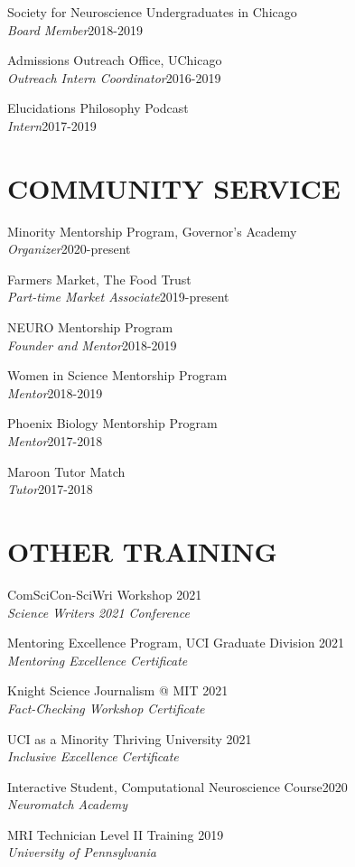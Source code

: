 \documentclass[margin, 10pt]{res} %
\begin{document}
\begin{resume}
{Society for Neuroscience Undergraduates in Chicago} \\
{\sl Board Member}\hfill{2018-2019}

{Admissions Outreach Office, UChicago} \\
{\sl Outreach Intern Coordinator}\hfill{2016-2019}

{Elucidations Philosophy Podcast} \\
{\sl Intern}\hfill{2017-2019}


\section{COMMUNITY SERVICE}


{Minority Mentorship Program, Governor's Academy} \\
{\sl Organizer}\hfill 2020-present

{Farmers Market, The Food Trust} \\
{\sl Part-time Market Associate}\hfill 2019-present

{NEURO Mentorship Program} \\
{\sl Founder and Mentor}\hfill{2018-2019}

{Women in Science Mentorship Program} \\
{\sl Mentor}\hfill{2018-2019}

{Phoenix Biology Mentorship Program} \\
{\sl Mentor}\hfill{2017-2018}

{Maroon Tutor Match} \\
{\sl Tutor}\hfill{2017-2018}




\section{OTHER TRAINING} 
ComSciCon-SciWri Workshop \hfill 2021 \\
{\sl  Science Writers 2021 Conference}

Mentoring Excellence Program, UCI Graduate Division \hfill 2021 \\
{\sl  Mentoring Excellence Certificate}

Knight Science Journalism @ MIT \hfill 2021 \\
{\sl  Fact-Checking Workshop Certificate}

UCI as a Minority Thriving University \hfill 2021 \\
{\sl Inclusive Excellence Certificate}

Interactive Student, Computational Neuroscience Course\hfill 2020 \\
{\sl Neuromatch Academy}

MRI Technician Level II Training \hfill 2019 \\
{\sl University of Pennsylvania}


\end{resume}
\end{document}
